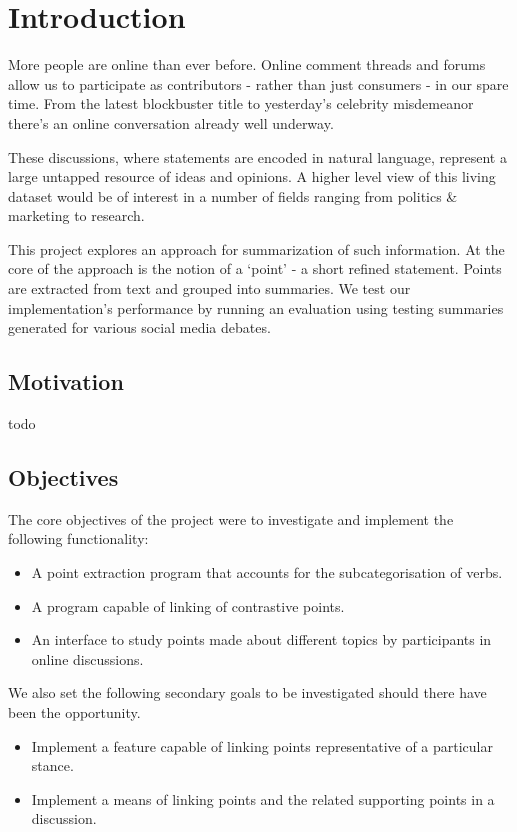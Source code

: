 \chapter{Introduction\label{chap:introduction}}
  More people are online than ever before. Online comment threads and forums allow us to participate as contributors - rather than just consumers - in our spare time. From the latest blockbuster title to yesterday's celebrity misdemeanor there's an online conversation already well underway.

  These discussions, where statements are encoded in natural language, represent a large untapped resource of ideas and opinions. A higher level view of this living dataset would be of interest in a number of fields ranging from politics \& marketing to research.

  This project explores an approach for summarization of such information. At the core of the approach is the notion of a `point' - a short refined statement. Points are extracted from text and grouped into summaries. We test our implementation's performance by running an evaluation using testing summaries generated for various social media debates.

  \section{Motivation}
    todo
  \section{Objectives}
    The core objectives of the project were to investigate and implement the following functionality:
    \begin{itemize}
      \item{A point extraction program that accounts for the subcategorisation of verbs.}
      \item{A program capable of linking of contrastive points.}
      \item{An interface to study points made about different topics by participants in online discussions.}
    \end{itemize}
    We also set the following secondary goals to be investigated should there have been the opportunity.
    \begin{itemize}
      \item{Implement a feature capable of linking points representative of a particular stance.}
      \item{Implement a means of linking points and the related supporting points in a discussion.}
    \end{itemize}

